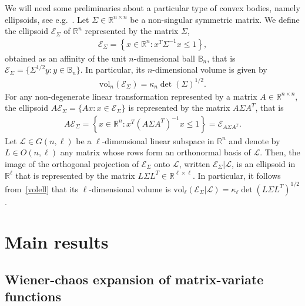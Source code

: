 \documentclass[10pt]{amsart}
\theoremstyle{definition}\newtheorem{defi}[theo]{Definition}\newtheorem{rema}[theo]{Remark}\newtheorem{exam}[theo]{Example}\newtheorem{exem}[theo]{Example}\newtheorem{nota}[theo]{Notation}
\newcommand{\scL}{\mathscr{L}}
\newcommand{\rvol}{\mathrm{vol}}
\newcommand{\clE}{\mathcal{E}}
\newcommand{\R}{\mathbb{R}}
\newcommand{\bbB}{\mathbb{B}}
\begin{document}
We will need some preliminaries about a particular type of convex bodies, namely ellipsoids, see e.g.~\cite{Kab14}. Let $\Sigma \in \R^{n\times n}$ be a non-singular symmetric matrix. We define the ellipsoid $\clE_{\Sigma}$ of $\R^n$ represented by the matrix $\Sigma$,
\begin{gather*}
\clE_{\Sigma}= \left\{x \in \R^n: x^T \Sigma^{-1}x \leq 1\right\},
\end{gather*}
obtained as an affinity of the unit $n$-dimensional ball $\bbB_n$, that is $\clE_{\Sigma}=\{ \Sigma^{1/2}y : y \in \bbB_n \} $. In particular, its $n$-dimensional volume is given by
\begin{gather}\label{volell}
\rvol_n(\clE_{\Sigma})= \kappa_n \det(\Sigma)^{1/2}.
\end{gather}
For any non-degenerate linear transformation represented by a matrix $A \in \R^{n \times n}$, the ellipsoid $A\clE_{\Sigma}= \{ Ax : x \in \clE_{\Sigma}\}$ is represented by the matrix $A\Sigma A^T$, that is
\begin{gather*}
A\clE_{\Sigma}= \left\{ x\in \R^n : x^T (A\Sigma A^T)^{-1} x \leq 1 \right\} = \clE_{A\Sigma A^T}.
\end{gather*}
Let $\scL \in G(n,\ell)$ be a $\ell$-dimensional linear subspace in $\R^n$ and denote by $L \in O(n,\ell)$ any matrix whose rows form an orthonormal basis of $\scL$. Then, the image of the orthogonal projection of $\clE_{\Sigma}$ onto $\scL$, written $\clE_{\Sigma}|\scL$, is an ellipsoid in $\R^{\ell}$ that is represented by the matrix $L\Sigma L^T \in \R^{\ell\times \ell}$. In particular, it follows from~\eqref{volell} that its $\ell$-dimensional volume is $\rvol_{\ell}(\clE_{\Sigma}|\scL)=
\kappa_{\ell}\det(L\Sigma L^T)^{1/2}$.


\section{Main results}\label{SecMainResults}

\subsection{Wiener-chaos expansion of matrix-variate functions}\label{SecWC}
\end{document}
